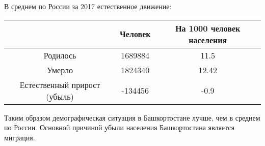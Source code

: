 \bigskip

В среднем по России за 2017 естественное движение:

\begin{tabular}{|c|c|c|}
	\hline
	& Человек & На 1000 человек населения \\
	\hline
	Родилось & 1689884 & 11.5 \\
	\hline
	Умерло &  1824340 & 12.42 \\
	\hline
	Естественный прирост (убыль) & -134456 & -0.9\\
	\hline
\end{tabular}

\bigskip

Таким образом демографическая ситуация в Башкортостане лучше, чем в среднем по России.
Основной причиной убыли населения Башкортостана является миграция.
